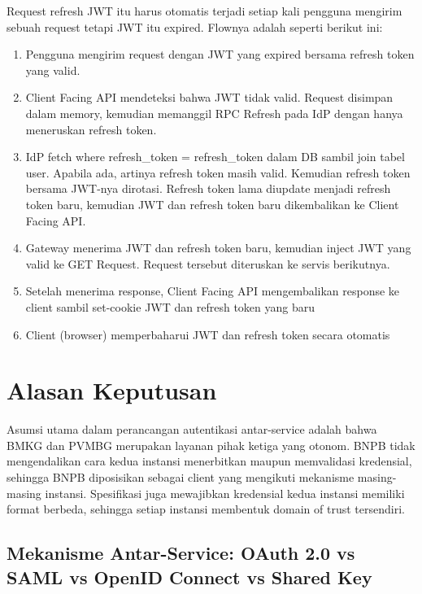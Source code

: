 Request refresh JWT itu harus otomatis terjadi setiap kali pengguna mengirim sebuah request tetapi JWT itu expired. Flownya adalah seperti berikut ini:

\begin{enumerate}
\def\labelenumi{\arabic{enumi}.}
\tightlist
\item
  Pengguna mengirim request dengan JWT yang expired bersama refresh token yang valid.\\
\item
  Client Facing API mendeteksi bahwa JWT tidak valid. Request disimpan dalam memory, kemudian memanggil RPC Refresh pada IdP dengan hanya meneruskan refresh token.\\
\item
  IdP fetch where refresh\_token = refresh\_token dalam DB sambil join tabel user. Apabila ada, artinya refresh token masih valid. Kemudian refresh token bersama JWT-nya dirotasi. Refresh token lama diupdate menjadi refresh token baru, kemudian JWT dan refresh token baru dikembalikan ke Client Facing API.\\
\item
  Gateway menerima JWT dan refresh token baru, kemudian inject JWT yang valid ke GET Request. Request tersebut diteruskan ke servis berikutnya.\\
\item
  Setelah menerima response, Client Facing API mengembalikan response ke client sambil set-cookie JWT dan refresh token yang baru\\
\item
  Client (browser) memperbaharui JWT dan refresh token secara otomatis
\end{enumerate}

\section{Alasan Keputusan}

Asumsi utama dalam perancangan autentikasi antar-service adalah bahwa BMKG dan PVMBG merupakan layanan pihak ketiga yang otonom. BNPB tidak mengendalikan cara kedua instansi menerbitkan maupun memvalidasi kredensial, sehingga BNPB diposisikan sebagai client yang mengikuti mekanisme masing-masing instansi. Spesifikasi juga mewajibkan kredensial kedua instansi memiliki format berbeda, sehingga setiap instansi membentuk domain of trust tersendiri.

\subsection{Mekanisme Antar-Service: OAuth 2.0 vs SAML vs OpenID Connect vs Shared Key}

